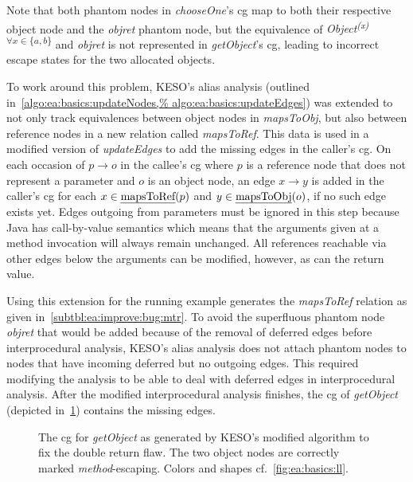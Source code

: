 			Note that both phantom nodes in \emph{chooseOne}'s \gls{cg} map to both their respective object node and the
			\emph{objret} phantom node, but the equivalence of \emph{Object\textsuperscript{(x) $\forall x \in \{a,b\}$}} and
			\emph{objret} is not represented in \emph{getObject}'s \gls{cg}, leading to incorrect escape states for the two
			allocated objects.

			To work around this problem, KESO's alias analysis (outlined in~\cref{algo:ea:basics:updateNodes,%
			algo:ea:basics:updateEdges}) was extended to not only track equivalences between object nodes in \emph{mapsToObj},
			but also between reference nodes in a new relation called \emph{mapsToRef}. This data is used in a modified
			version of \emph{updateEdges} to add the missing edges in the caller's \gls{cg}. On each occasion of
				$p \rightarrow o$
			in the callee's \gls{cg} where $p$ is a reference node that does not represent a parameter and $o$ is an object
			node, an edge
				$x \rightarrow y$
			is added in the caller's \gls{cg} for each
				$x \in \text{\emph{mapsToRef}}(p)$ and $y \in \text{\emph{mapsToObj}}(o)$,
			if no such edge exists yet. Edges outgoing from parameters must be ignored in this step because Java has
			call-by-value semantics which means that the arguments given at a method invocation will always remain unchanged.
			All references reachable via other edges below the arguments can be modified, however, as can the return value.

			Using this extension for the running example generates the \emph{mapsToRef} relation as given
			in~\cref{subtbl:ea:improve:bug:mtr}. To avoid the superfluous phantom node \emph{objret} that would be added
			because of the removal of deferred edges before interprocedural analysis, KESO's alias analysis does not attach
			phantom nodes to nodes that have incoming deferred but no outgoing edges. This required modifying the analysis to
			be able to deal with deferred edges in interprocedural analysis. After the modified interprocedural analysis
			finishes, the \gls{cg} of \emph{getObject} (depicted in~\cref{fig:ea:improve:bug:fix}) contains the missing edges.

			\begin{figure}
				\centering%

				\caption[The \gls{cg} for \emph{getObject} with the double return flaw fixed]{%
					The \gls{cg} for \emph{getObject} as generated by KESO's modified algorithm to fix the double return flaw. The
					two object nodes are correctly marked \emph{method}-escaping. Colors and shapes cf.~\cref{fig:ea:basics:ll}.}%
				\label{fig:ea:improve:bug:fix}%
			\end{figure}

